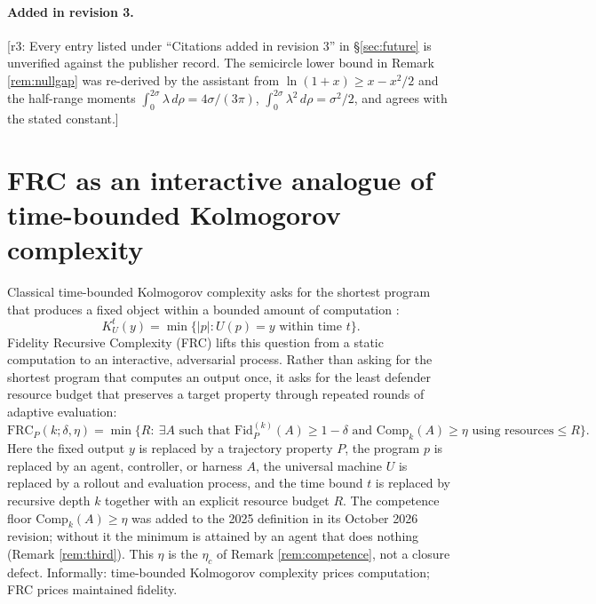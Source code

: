 \documentclass[11pt]{article}
\theoremstyle{definition}
\theoremstyle{remark}
\newcommand{\revnote}[1]{\textcolor{red!60!black}{[r3: #1]}}
\begin{document}
\paragraph{Added in revision 3.} \revnote{Every entry listed under ``Citations added in revision 3'' in \S\ref{sec:future} is unverified against the publisher record. The semicircle lower bound in Remark \ref{rem:nullgap} was re-derived by the assistant from $\ln(1+x)\ge x-x^2/2$ and the half-range moments $\int_0^{2\sigma}\lambda\,d\rho=4\sigma/(3\pi)$, $\int_0^{2\sigma}\lambda^2\,d\rho=\sigma^2/2$, and agrees with the stated constant.}

\section{FRC as an interactive analogue of time-bounded Kolmogorov complexity}\label{app:frc}

Classical time-bounded Kolmogorov complexity asks for the shortest program that produces a fixed object within a bounded amount of computation \cite{livitanyi2019}:
\begin{equation}
K^t_U(y)=\min\{|p|: U(p)=y\text{ within time }t\}.
\end{equation}
Fidelity Recursive Complexity (FRC) lifts this question from a static computation to an interactive, adversarial process. Rather than asking for the shortest program that computes an output once, it asks for the least defender resource budget that preserves a target property through repeated rounds of adaptive evaluation:
\begin{equation}
\mathrm{FRC}_P(k;\delta,\eta)=\min\{R:\ \exists A\text{ such that }\mathrm{Fid}^{(k)}_P(A)\ge1-\delta\text{ and }\mathrm{Comp}_k(A)\ge\eta\text{ using resources}\le R\}.
\end{equation}
Here the fixed output $y$ is replaced by a trajectory property $P$, the program $p$ is replaced by an agent, controller, or harness $A$, the universal machine $U$ is replaced by a rollout and evaluation process, and the time bound $t$ is replaced by recursive depth $k$ together with an explicit resource budget $R$. The competence floor $\mathrm{Comp}_k(A)\ge\eta$ was added to the 2025 definition in its October 2026 revision; without it the minimum is attained by an agent that does nothing (Remark \ref{rem:third}). This $\eta$ is the $\eta_c$ of Remark \ref{rem:competence}, not a closure defect. Informally: time-bounded Kolmogorov complexity prices computation; FRC prices maintained fidelity.
\end{document}
